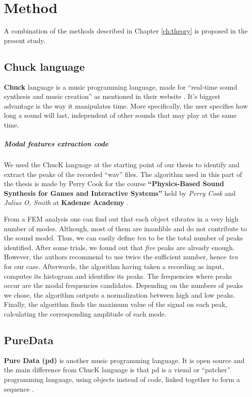 \chapter{Method}\label{ch:method}

A combination of the methods described in Chapter \ref{ch:theory} is proposed in the present study.


\section{Chuck language}
\textbf{Chuck} language is a music programming language, made for ``real-time sound synthesis and music creation'' as mentioned in their website \cite{bib:chuck}. It's biggest advantage is the way it manipulates time. More specifically, the user specifies how long a sound will last, independent of other sounds that may play at the same time.

\paragraph{Modal features extraction code\\}
We used the ChucK language at the starting point of our thesis to identify and extract the peaks of the recorded ``wav'' files. The algorithm used in this part of the thesis is made by Perry Cook for the course \textbf{``Physics-Based Sound Synthesis for Games and Interactive Systems''} held by \textit{Perry Cook} and \textit{Julius O. Smith} at \textbf{Kadenze Academy} \cite{bib:physicsbasedcourse}.

From a FEM analysis one can find out that each object vibrates in a very high number of modes. Although, most of them are inaudible and do not contribute to the sound model. Thus, we can easily define \textit{ten} to be the total number of peaks identified. After some trials, we found out that \textit{five} peaks are already enough. However, the authors recommend to use twice the sufficient number, hence \textit{ten} for our case. Afterwards, the algorithm having taken a recording as input, computes its histogram and identifies its peaks. The frequencies where peaks occur are the modal frequencies candidates. Depending on the numbers of peaks we chose, the algorithm outputs a normalization between high and low peaks. Finally, the algorithm finds the maximum value of the signal on each peak, calculating the corresponding amplitude of each mode.

 
\section{PureData}
\textbf{Pure Data (pd)} is another music programming language. It is open source and the main difference from ChucK language is that pd is a visual or ``patcher'' programming language, using objects instead of code, linked together to form a sequence \cite{bib:pd}.

